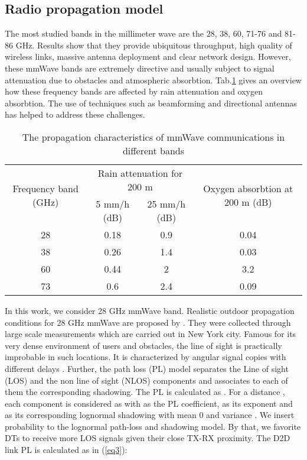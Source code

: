 \documentclass[conference,onecolumn,12pt]{IEEEtran}
\begin{document}
\subsection{Radio propagation model}
The most studied bands in the millimeter wave are the 28, 38, 60, 71-76 and 81-86 GHz. Results show that they provide ubiquitous throughput, high quality of wireless links, massive antenna deployment and clear network design. However, these mmWave bands are extremely directive and usually subject to signal attenuation due to obstacles and atmospheric absorbtion. Tab.\ref{mmWattenuation} gives an overview how these frequency bands are affected by rain attenuation and oxygen absorbtion. The use of techniques such as beamforming and directional antennas has helped to address these challenges.
\begin{table}[!t]
\caption{The propagation characteristics of mmWave communications in different bands\cite{mmWlimits}} \label{mmWattenuation}
\center
\begin{center}
\begin{tabular}{|c|c|c|c|}
  \hline
    \multirow{2}{1.5cm}{Frequency  band (GHz)}& \multicolumn{2}{|c|}{Rain attenuation for 200 m }&\multirow{2}{2.3cm}{Oxygen absorbtion at 200 m (dB)} \\ \cline{2-3}
&5 mm/h (dB)& 25 mm/h (dB)& \\ \hline
  28 & 0.18 & 0.9 & 0.04 \\\hline
  38 & 0.26 & 1.4 & 0.03 \\\hline
  60 & 0.44 & 2 & 3.2 \\\hline
  73 & 0.6 & 2.4 & 0.09 \\\hline
  \hline
\end{tabular}
\end{center}
\end{table}

In this work, we consider 28 GHz mmWave band. Realistic outdoor propagation conditions for 28 GHz mmWave are proposed by \cite{73PLmodel}. They were collected through large scale measurements which are carried out in New York city. Famous for its very dense environment of users and obstacles, the line of sight is practically improbable in such locations. It is characterized by angular signal copies with different delays \cite{mmWvErkip}.
Further, the path loss (PL) model separates the Line of sight (LOS) and the non line of sight (NLOS) components and associates to each of them the corresponding shadowing. The PL is calculated as . For a distance , each component is considered as  with  as the PL coefficient,  as its exponent and  as its corresponding lognormal shadowing with mean 0 and variance . We insert probability to the lognormal path-loss and shadowing model. By that, we favorite DTs to receive more LOS signals given their close TX-RX proximity. The D2D link PL is calculated as in (\ref{eq3}):
\end{document}
